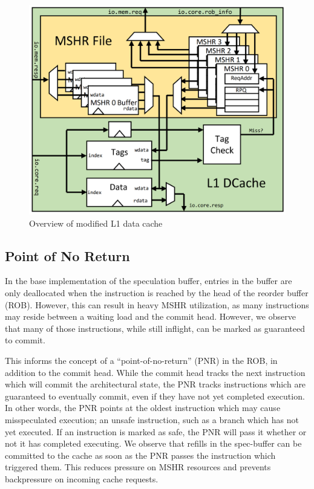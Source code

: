 \begin{figure}[h]
  \begin{center}\includegraphics[scale=0.17]{dcache.png}\end{center}
  \caption{Overview of modified L1 data cache}
\end{figure}

\subsection{Point of No Return}
In the base implementation of the speculation buffer, entries in the buffer are only deallocated when the instruction is reached by the head of the reorder buffer (ROB). However, this can result in heavy MSHR utilization, as many instructions may reside between a waiting load and the commit head. However, we observe that many of those instructions, while still inflight, can be marked as guaranteed to commit.

This informs the concept of a ``point-of-no-return'' (PNR) in the ROB, in addition to the commit head. While the commit head tracks the next instruction which will commit the architectural state, the PNR tracks instructions which are guaranteed to eventually commit, even if they have not yet completed execution. In other words, the PNR points at the oldest instruction which may cause misspeculated execution; an unsafe instruction, such as a branch which has not yet executed. If an instruction is marked as safe, the PNR will pass it whether or not it has completed executing. We observe that refills in the spec-buffer can be committed to the cache as soon as the PNR passes the instruction which triggered them. This reduces pressure on MSHR resources and prevents backpressure on incoming cache requests.

